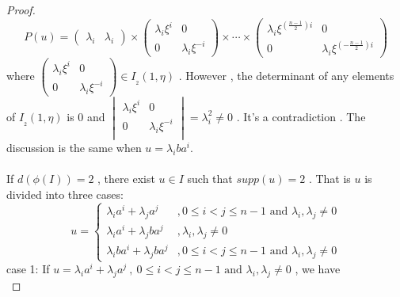 \documentclass{article}
\begin{document}
\begin{proof}
\begin{equation*}
    P(u)=\begin{pmatrix}
          \lambda_i&\lambda_i
        \end{pmatrix}
        \times
        \begin{pmatrix}
            \lambda_i\xi^{\scriptscriptstyle i}&0\\
            0&\lambda_i\xi^{\scriptscriptstyle-i}
        \end{pmatrix}
        \times\cdots\times
        \begin{pmatrix}
            \lambda_i\xi^{(\scriptscriptstyle\frac{n-1}{2})i}&0\\
            0&\lambda_i\xi^{(\scriptscriptstyle-\frac{n-1}{2})i}
        \end{pmatrix}
\end{equation*}
where $\begin{pmatrix}
            \lambda_i\xi^{\scriptscriptstyle i}&0\\
            0&\lambda_i\xi^{\scriptscriptstyle-i}
        \end{pmatrix}\in{I_{_2}}(1,\eta)$ . 
However , the determinant of any elements of $I_{_2}(1,\eta)$ is $0$ and 
$\begin{vmatrix}
\lambda_i\xi^{\scriptscriptstyle i}&0\\
0&\lambda_i\xi^{\scriptscriptstyle-i} \\
\end{vmatrix}=\lambda_{i}^{\scriptscriptstyle2}\neq0$ . 
It's a contradiction . The discussion is the same when $u=\lambda_i ba^{\scriptscriptstyle i}$.\\
\quad\\
If $d(\phi(I))=2$ , there exist $u\in{I}$ such that $supp(u)=2$ . That is $u$ is divided into three cases:
\[
u=\begin{cases}
\lambda_{i}a^{\scriptscriptstyle i}+\lambda_{j}a^{\scriptscriptstyle j}&,0\leq i<j\leq n-1 \text{ and } \lambda_i,\lambda_j\neq0\\
\lambda_{i}a^{\scriptscriptstyle i}+\lambda_{j}ba^{\scriptscriptstyle j}&,\lambda_i,\lambda_j\neq0\\
\lambda_{i}ba^{\scriptscriptstyle i}+\lambda_{j}ba^{\scriptscriptstyle j}&,0\leq i<j\leq n-1\text{ and } \lambda_i,\lambda_j\neq0
\end{cases}
\]
case 1: If $u=\lambda_{i}a^{\scriptscriptstyle i}+\lambda_{j}a^{\scriptscriptstyle j}\:,\:0\leq i<j\leq n-1 \text{ and } \lambda_i,\lambda_j\neq0$ , we have 
\begin{equation*}

\end{equation*}
\end{proof}
\end{document}
